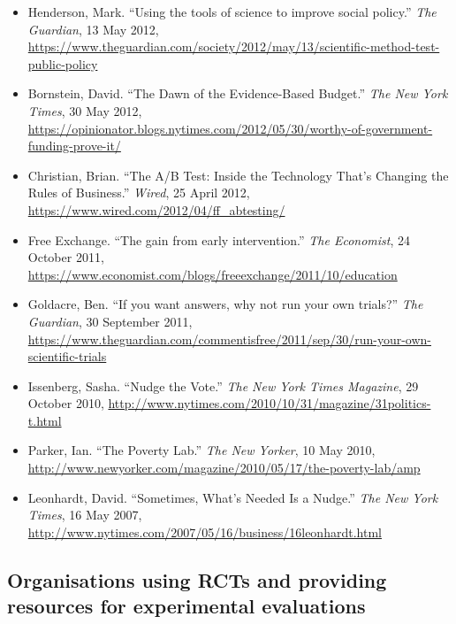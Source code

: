 \documentclass[12pt,a4paper]{article}
\begin{document}
\begin{itemize}
\item Henderson, Mark. ``Using the tools of science to improve social policy.'' \textit{The Guardian}, 13 May 2012, \url{https://www.theguardian.com/society/2012/may/13/scientific-method-test-public-policy}

\item Bornstein, David. ``The Dawn of the Evidence-Based Budget.'' \textit{The New York Times}, 30 May 2012, \url{https://opinionator.blogs.nytimes.com/2012/05/30/worthy-of-government-funding-prove-it/}

\item Christian, Brian. ``The A/B Test: Inside the Technology That's Changing the Rules of Business.'' \textit{Wired}, 25 April 2012, \url{https://www.wired.com/2012/04/ff_abtesting/}

\item Free Exchange. ``The gain from early intervention.'' \textit{The Economist}, 24 October 2011, \url{https://www.economist.com/blogs/freeexchange/2011/10/education}

\item Goldacre, Ben. ``If you want answers, why not run your own trials?'' \textit{The Guardian}, 30 September 2011, \url{https://www.theguardian.com/commentisfree/2011/sep/30/run-your-own-scientific-trials}

\item Issenberg, Sasha. ``Nudge the Vote.'' \textit{The New York Times Magazine}, 29 October 2010, \url{http://www.nytimes.com/2010/10/31/magazine/31politics-t.html}

\item Parker, Ian. ``The Poverty Lab.'' \textit{The New Yorker}, 10 May 2010, \url{http://www.newyorker.com/magazine/2010/05/17/the-poverty-lab/amp}

\item Leonhardt, David. ``Sometimes, What's Needed Is a Nudge.'' \textit{The New York Times}, 16 May 2007, \url{http://www.nytimes.com/2007/05/16/business/16leonhardt.html}

\end{itemize}


\subsection*{Organisations using RCTs and providing resources for experimental evaluations}
\end{document}
